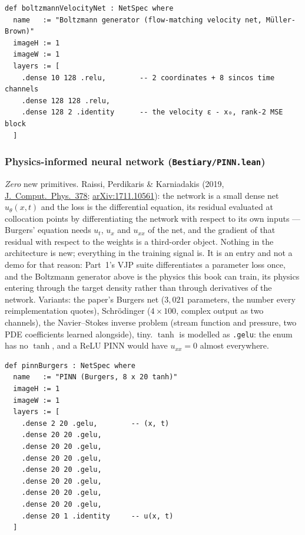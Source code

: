 \begin{verbatim}
def boltzmannVelocityNet : NetSpec where
  name   := "Boltzmann generator (flow-matching velocity net, Müller-Brown)"
  imageH := 1
  imageW := 1
  layers := [
    .dense 10 128 .relu,        -- 2 coordinates + 8 sincos time channels
    .dense 128 128 .relu,
    .dense 128 2 .identity      -- the velocity ε - x₀, rank-2 MSE block
  ]
\end{verbatim}

\subsubsection*{Physics-informed neural network (\texttt{Bestiary/PINN.lean})}
\emph{Zero} new primitives. Raissi, Perdikaris \& Karniadakis (2019,
\href{https://doi.org/10.1016/j.jcp.2018.10.045}{J.\ Comput.\ Phys.\ 378};
\href{https://arxiv.org/abs/1711.10561}{arXiv:1711.10561}): the network is a
small dense net $u_\theta(x, t)$ and the loss is the differential equation,
its residual evaluated at collocation points by differentiating the network
with respect to its own inputs --- Burgers' equation needs $u_t$, $u_x$ and
$u_{xx}$ of the net, and the gradient of that residual with respect to the
weights is a third-order object. Nothing in the architecture is new;
everything in the training signal is. It is an entry and not a demo for that
reason: Part~1's VJP suite differentiates a parameter loss once, and the
Boltzmann generator above is the physics this book can train, its physics
entering through the target density rather than through derivatives of the
network. Variants: the paper's Burgers net ($3{,}021$ parameters, the number
every reimplementation quotes), Schr\"odinger ($4 \times 100$, complex output
as two channels), the Navier--Stokes inverse problem (stream function and
pressure, two PDE coefficients learned alongside), tiny. $\tanh$ is modelled
as \texttt{.gelu}: the enum has no $\tanh$, and a ReLU PINN would have
$u_{xx} = 0$ almost everywhere.

\begin{verbatim}
def pinnBurgers : NetSpec where
  name   := "PINN (Burgers, 8 x 20 tanh)"
  imageH := 1
  imageW := 1
  layers := [
    .dense 2 20 .gelu,        -- (x, t)
    .dense 20 20 .gelu,
    .dense 20 20 .gelu,
    .dense 20 20 .gelu,
    .dense 20 20 .gelu,
    .dense 20 20 .gelu,
    .dense 20 20 .gelu,
    .dense 20 20 .gelu,
    .dense 20 1 .identity     -- u(x, t)
  ]
\end{verbatim}

